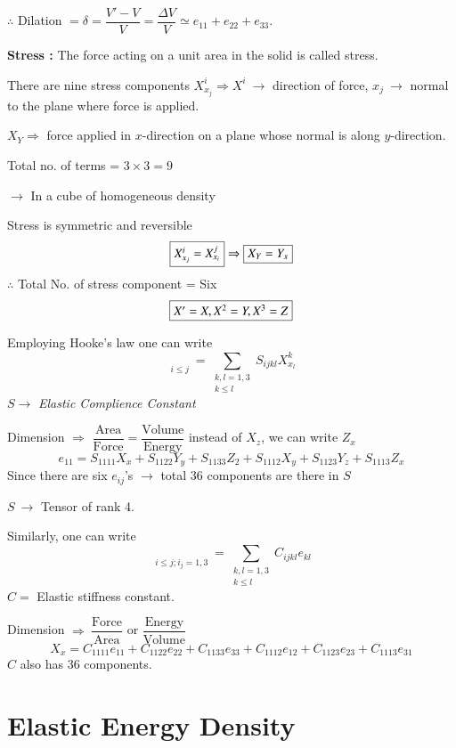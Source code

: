 $\therefore$ Dilation $=\delta=\dfrac{V'-V}{V}=\dfrac{\Delta V}{V}\simeq e_{11}+e_{22}+e_{33}$.

\noindent
{\bf Stress :} The force acting on a unit area in the solid is called stress.

There are nine stress components $X^{i}_{x_{j}}\Rightarrow X^{i} \ \to$ direction of force, $x_{j} \ \to$ normal to the plane where force is applied.

$X_{Y}\Rightarrow$ force applied in $x$-direction on a plane whose normal is along $y$-direction.

Total no. of terms = $3\times 3=9$

$\to$ In a cube of homogeneous density

Stress is symmetric and reversible
$$
\fbox{$X^{i}_{x_{j}}=X^{j}_{x_{i}}$}\Rightarrow \fbox{$X_{Y}=Y_{x}$}
$$
$\therefore$ Total No. of stress component = Six
$$
\fbox{$X'=X, X^{2}=Y, X^{3}=Z$}
$$

Employing Hooke's law one can write
$$
{\displaystyle{\mathop{e_{ij}}\limits_{i\leq j}}}=\sum\limits_{\substack{k,l=1,3\\ k\leq l}}S_{ijkl}X^{k}_{x_{l}}
$$
$S\to$ {\em Elastic Complience Constant}

Dimension $\Rightarrow$ $\dfrac{\text{Area}}{\text{Force}}=\dfrac{\text{Volume}}{\text{Energy}}$ instead of $X_{z}$, we can write $Z_{x}$
$$
e_{11}=S_{1111}X_{x}+S_{1122}Y_{y}+S_{1133}Z_{2}+S_{1112}X_{y}+S_{1123}Y_{z}+S_{1113}Z_{x}
$$
Since there are six $e_{ij}$'s $\to$ total 36 components are there in $S$

$S \ \to$ Tensor of rank 4.

Similarly, one can write
$$
{\displaystyle{\mathop{X^{i}_{x_{j}}}\limits_{i\leq j; i_{j}=1,3}}}=\sum\limits_{\substack{k,l=1,3\\ k\leq l}}C_{ijkl}e_{kl}
$$
$C=$ Elastic stiffness constant.

\medskip

Dimension $\Rightarrow \ \dfrac{\text{Force}}{\text{Area}}$ or $\dfrac{\text{Energy}}{\text{Volume}}$
$$
X_{x}=C_{1111}e_{11}+C_{1122}e_{22}+C_{1133}e_{33}+C_{1112}e_{12}+C_{1123}e_{23}+C_{1113}e_{31}
$$
$C$ also has 36 components.

\section*{Elastic Energy Density}

